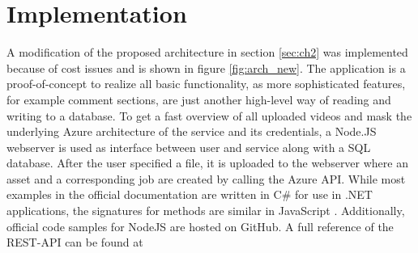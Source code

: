 \section{Implementation}\label{sec:ch3}


A modification of the proposed architecture in section \ref{sec:ch2} was 
implemented because of cost issues and is shown in figure \ref{fig:arch_new}.
The application is a proof-of-concept to realize all basic functionality, 
as more sophisticated features, for example comment sections, are just another 
high-level way of reading and writing to a database.
To get a fast overview of all uploaded videos and mask the underlying Azure 
architecture of the service and its credentials, a Node.JS webserver 
is used as interface between user and service along with a SQL database. After the user 
specified a file, it is uploaded to the webserver where an asset and a 
corresponding job are created by calling the Azure API. While most examples in 
the official documentation are written in C\# for use in .NET applications, the signatures for 
methods are similar in JavaScript \cite{azNodeAPI}. Additionally, official code samples for NodeJS are hosted on GitHub. A full reference of the REST-API can be found at \cite{azRestAPI}

